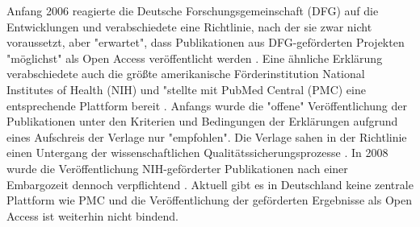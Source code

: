 Anfang 2006 reagierte die Deutsche Forschungsgemeinschaft (DFG) auf die Entwicklungen und verabschiedete eine Richtlinie, nach der sie zwar nicht voraussetzt, aber "erwartet", dass Publikationen aus DFG-geförderten Projekten "möglichst" als Open Access veröffentlicht werden \cite{suchen:dfg-richtlinie}. Eine ähnliche Erklärung verabschiedete auch die größte amerikanische Förderinstitution National Institutes of Health (NIH) und "stellte mit PubMed Central (PMC) eine entsprechende Plattform bereit \cite{muller_2010_open}. Anfangs wurde die "offene" Veröffentlichung der Publikationen unter den Kriterien und Bedingungen der Erklärungen aufgrund eines Aufschreis der Verlage nur "empfohlen". Die Verlage sahen in der Richtlinie einen Untergang der wissenschaftlichen Qualitätssicherungsprozesse \cite{Baggs_2006}. In 2008 wurde die Veröffentlichung NIH-geförderter Publikationen nach einer Embargozeit dennoch verpflichtend \cite{Hanekop_2014}. Aktuell gibt es in Deutschland keine zentrale Plattform wie PMC und die Veröffentlichung der geförderten Ergebnisse als Open Access ist weiterhin nicht bindend.

